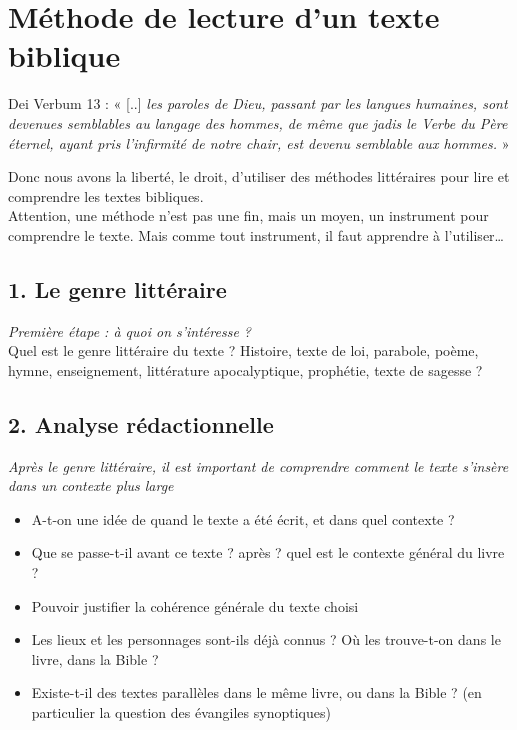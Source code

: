 \noindent
\section*{Méthode de lecture d'un texte biblique}
Dei Verbum 13 : « [..] \emph{les paroles de Dieu, passant par les langues humaines, sont devenues semblables au langage des hommes, de même que jadis le Verbe du Père éternel, ayant pris l’infirmité de notre chair, est devenu semblable aux hommes.} »\par
Donc nous avons la liberté, le droit, d’utiliser des méthodes littéraires pour lire et comprendre les textes bibliques.\\
Attention, une méthode n’est pas une fin, mais un moyen, un instrument pour comprendre le texte. Mais comme tout instrument, il faut apprendre à l’utiliser…

\subsection*{1. Le genre littéraire}
\emph{Première étape : à quoi on s’intéresse ?}\\
Quel est le genre littéraire du texte ? Histoire, texte de loi, parabole, poème, hymne, enseignement, littérature apocalyptique, prophétie, texte de sagesse ?
\subsection*{2. Analyse rédactionnelle}
\emph{Après le genre littéraire, il est important de comprendre comment le texte s’insère dans un contexte plus large}\\
\begin{itemize}[label=]
\item A-t-on une idée de quand le texte a été écrit, et dans quel contexte ?
\item Que se passe-t-il avant ce texte ? après ? quel est le contexte général du livre ?
\item Pouvoir justifier la cohérence générale du texte choisi
\item Les lieux et les personnages sont-ils déjà connus ? Où les trouve-t-on dans le livre, dans la Bible ?
\item Existe-t-il des textes parallèles dans le même livre, ou dans la Bible ? (en particulier la question des évangiles synoptiques)
\end{itemize}
